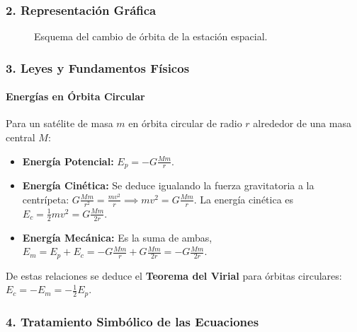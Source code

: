 \subsubsection*{2. Representación Gráfica}
\begin{figure}[H]
    \centering
    \caption{Esquema del cambio de órbita de la estación espacial.}
\end{figure}

\subsubsection*{3. Leyes y Fundamentos Físicos}
\paragraph*{Energías en Órbita Circular}
Para un satélite de masa $m$ en órbita circular de radio $r$ alrededor de una masa central $M$:
\begin{itemize}
    \item \textbf{Energía Potencial:} $E_p = -G\frac{Mm}{r}$.
    \item \textbf{Energía Cinética:} Se deduce igualando la fuerza gravitatoria a la centrípeta: $G\frac{Mm}{r^2} = \frac{mv^2}{r} \implies mv^2 = G\frac{Mm}{r}$. La energía cinética es $E_c = \frac{1}{2}mv^2 = G\frac{Mm}{2r}$.
    \item \textbf{Energía Mecánica:} Es la suma de ambas, $E_m = E_p + E_c = -G\frac{Mm}{r} + G\frac{Mm}{2r} = -G\frac{Mm}{2r}$.
\end{itemize}
De estas relaciones se deduce el \textbf{Teorema del Virial} para órbitas circulares: $E_c = -E_m = -\frac{1}{2}E_p$.

\subsubsection*{4. Tratamiento Simbólico de las Ecuaciones}
